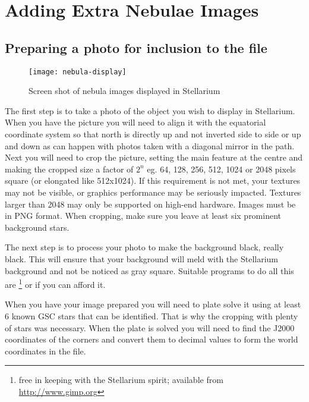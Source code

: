 \section{Adding Extra Nebulae Images}%
\label{sec:dso:adding_images}

\subsection{\texorpdfstring{Preparing a photo for inclusion to the  file}{Preparing a photo for inclusion to the textures.json file}}
\label{sec:dso:preparing-a-photo}

\begin{figure}[h]
\centering\texttt{[image: nebula-display]}
\caption{Screen shot of nebula images displayed in Stellarium}
\label{fig:dso:preparing-a-photo}
\end{figure}

The first step is to take a photo of the object you wish to display in
Stellarium. When you have the picture you will need to align it with
the equatorial coordinate system so that north is directly up and not
inverted side to side or up and down as can happen with photos taken
with a diagonal mirror in the path. Next you will need to crop the
picture, setting the main feature at the centre and making the cropped
size a factor of $2^n$ eg. 64, 128, 256, 512, 1024 or 2048 pixels
square (or elongated like 512x1024).  If this requirement is not met,
your textures may not be visible, or graphics performance may be
seriously impacted. Textures larger than 2048 may only be supported on
high-end hardware. Images must be in PNG format.  When cropping, make
sure you leave at least six prominent background stars.

The next step is to process your photo to make the background
black, really black. This will ensure that your background will meld with the
Stellarium background and not be noticed as gray square. Suitable programs to do all
this are \footnote{free in keeping with the Stellarium spirit; available from \url{http://www.gimp.org}} or
 if you can afford it.

When you have your image prepared you will need to plate solve it using
at least 6 known GSC stars that can be identified. That is why the
cropping with plenty of stars was necessary. When the plate is solved
you will need to find the J2000 coordinates of the corners and convert
them to decimal values to form the world coordinates in the
 file.

